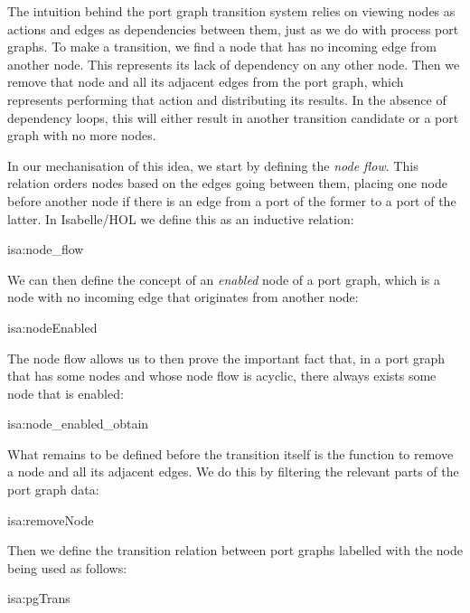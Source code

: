 \documentclass[class=smolathesis,crop=false]{standalone}
\begin{document}
The intuition behind the port graph transition system relies on viewing nodes as actions and edges as dependencies between them, just as we do with process port graphs.
To make a transition, we find a node that has no incoming edge from another node.
This represents its lack of dependency on any other node.
Then we remove that node and all its adjacent edges from the port graph, which represents performing that action and distributing its results.
In the absence of dependency loops, this will either result in another transition candidate or a port graph with no more nodes.

In our mechanisation of this idea, we start by defining the \emph{node flow}.
This relation orders nodes based on the edges going between them, placing one node before another node if there is an edge from a port of the former to a port of the latter.
In Isabelle/HOL we define this as an inductive relation:
\begin{isadef}{isa:node_flow}
  
\end{isadef}

We can then define the concept of an \emph{enabled} node of a port graph, which is a node with no incoming edge that originates from another node:
\begin{isadef}{isa:nodeEnabled}
  
\end{isadef}

The node flow allows us to then prove the important fact that, in a port graph that has some nodes and whose node flow is acyclic, there always exists some node that is enabled:
\begin{isalemma}{isa:node_enabled_obtain}
  
\end{isalemma}

What remains to be defined before the transition itself is the function to remove a node and all its adjacent edges.
We do this by filtering the relevant parts of the port graph data:
\begin{isadef}{isa:removeNode}
  
\end{isadef}

Then we define the transition relation between port graphs labelled with the node being used as follows\footnotemark:
\begin{isadef}{isa:pgTrans}
  
\end{isadef}
\end{document}
